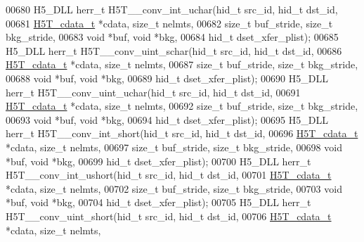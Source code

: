 \begin{DoxyCode}
00680 H5\_DLL herr\_t H5T\_\_conv\_int\_uchar(hid\_t src\_id, hid\_t dst\_id,
00681                   \hyperlink{struct_h5_t__cdata__t}{H5T\_cdata\_t} *cdata, \textcolor{keywordtype}{size\_t} nelmts,
00682                   \textcolor{keywordtype}{size\_t} buf\_stride, \textcolor{keywordtype}{size\_t} bkg\_stride,
00683                                   \textcolor{keywordtype}{void} *buf, \textcolor{keywordtype}{void} *bkg,
00684                                   hid\_t dset\_xfer\_plist);
00685 H5\_DLL herr\_t H5T\_\_conv\_uint\_schar(hid\_t src\_id, hid\_t dst\_id,
00686                    \hyperlink{struct_h5_t__cdata__t}{H5T\_cdata\_t} *cdata, \textcolor{keywordtype}{size\_t} nelmts,
00687                    \textcolor{keywordtype}{size\_t} buf\_stride, \textcolor{keywordtype}{size\_t} bkg\_stride,
00688                                    \textcolor{keywordtype}{void} *buf, \textcolor{keywordtype}{void} *bkg,
00689                                    hid\_t dset\_xfer\_plist);
00690 H5\_DLL herr\_t H5T\_\_conv\_uint\_uchar(hid\_t src\_id, hid\_t dst\_id,
00691                    \hyperlink{struct_h5_t__cdata__t}{H5T\_cdata\_t} *cdata, \textcolor{keywordtype}{size\_t} nelmts,
00692                    \textcolor{keywordtype}{size\_t} buf\_stride, \textcolor{keywordtype}{size\_t} bkg\_stride,
00693                                    \textcolor{keywordtype}{void} *buf, \textcolor{keywordtype}{void} *bkg,
00694                                    hid\_t dset\_xfer\_plist);
00695 H5\_DLL herr\_t H5T\_\_conv\_int\_short(hid\_t src\_id, hid\_t dst\_id,
00696                   \hyperlink{struct_h5_t__cdata__t}{H5T\_cdata\_t} *cdata, \textcolor{keywordtype}{size\_t} nelmts,
00697                   \textcolor{keywordtype}{size\_t} buf\_stride, \textcolor{keywordtype}{size\_t} bkg\_stride,
00698                                   \textcolor{keywordtype}{void} *buf, \textcolor{keywordtype}{void} *bkg,
00699                                   hid\_t dset\_xfer\_plist);
00700 H5\_DLL herr\_t H5T\_\_conv\_int\_ushort(hid\_t src\_id, hid\_t dst\_id,
00701                    \hyperlink{struct_h5_t__cdata__t}{H5T\_cdata\_t} *cdata, \textcolor{keywordtype}{size\_t} nelmts,
00702                    \textcolor{keywordtype}{size\_t} buf\_stride, \textcolor{keywordtype}{size\_t} bkg\_stride,
00703                                    \textcolor{keywordtype}{void} *buf, \textcolor{keywordtype}{void} *bkg,
00704                                    hid\_t dset\_xfer\_plist);
00705 H5\_DLL herr\_t H5T\_\_conv\_uint\_short(hid\_t src\_id, hid\_t dst\_id,
00706                    \hyperlink{struct_h5_t__cdata__t}{H5T\_cdata\_t} *cdata, \textcolor{keywordtype}{size\_t} nelmts,

\end{DoxyCode}
